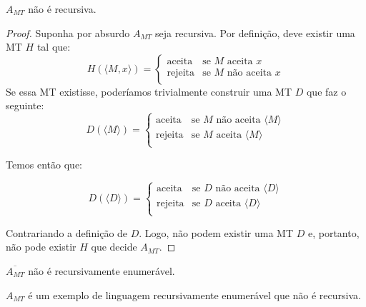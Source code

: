 \begin{theorem}
  \label{teo:parada}
  $A_{MT}$ não é recursiva.
\end{theorem}
\begin{proof}
  Suponha por absurdo $A_{MT}$ seja recursiva.
  Por definição, deve existir uma MT $H$ tal que:
  \begin{displaymath}
    H(\langle M, x \rangle) = \left\{\begin{array}{cl}
                 \textrm{aceita} & \textrm{se $M$ aceita $x$}\\
                 \textrm{rejeita} & \textrm{se $M$ não aceita $x$}\\ 
               \end{array}\right.
  \end{displaymath}
  Se essa MT existisse, poderíamos trivialmente construir uma MT $D$ que faz o seguinte:
  \begin{displaymath}
    D(\langle M \rangle) =  \left\{\begin{array}{cl}
                \textrm{aceita} & \textrm{se $M$ não aceita $\langle M \rangle$}\\
                \textrm{rejeita} & \textrm{se $M$ aceita $\langle M \rangle$}\\ 
              \end{array}\right.
  \end{displaymath}

  Temos então que:

  \begin{displaymath}
    D(\langle D \rangle) = \left\{\begin{array}{cl}
               \textrm{aceita} & \textrm{se $D$ não aceita $\langle D \rangle$}\\
               \textrm{rejeita} & \textrm{se $D$ aceita $\langle D \rangle$}\\
             \end{array}\right.
  \end{displaymath}

  Contrariando a definição de $D$.
  Logo, não podem existir uma MT $D$ e, portanto, não pode existir $H$ que decide $A_{MT}$.
\end{proof}

\begin{corollary}
  $\overline{A_{MT}}$ não é recursivamente enumerável.
\end{corollary}

$A_{MT}$ é um exemplo de linguagem recursivamente enumerável que não é recursiva.

